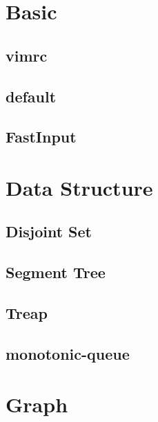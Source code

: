 \documentclass[a4paper,10pt,twocolumn,oneside]{article}
\begin{document}
\pagestyle{fancy}
\fancyfoot{}
\fancyhead[R]{\thepage}
\renewcommand{\headrulewidth}{0.4pt}
\renewcommand{\contentsname}{Contents} 

\scriptsize
\tableofcontents

\newpage

\section{Basic}
\subsection{vimrc}

\subsection{default}

\subsection{FastInput}


\newpage
\section{Data Structure}
\subsection{Disjoint Set}

\subsection{Segment Tree}

\subsection{Treap}

\subsection{monotonic-queue}

\newpage

\section{Graph}
\end{document}
